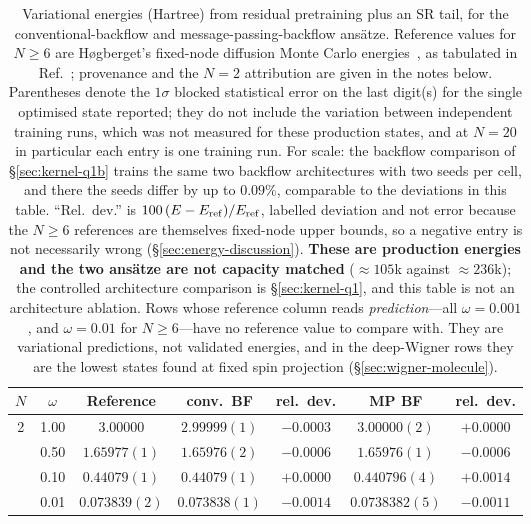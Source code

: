 \begin{table}[htbp]
  \centering
  \caption[Variational energies against the available references]{Variational energies
  (Hartree) from residual pretraining plus an SR tail, for the conventional-backflow and
  message-passing-backflow ans\"atze. Reference values for $N\ge6$ are H{\o}gberget's
  fixed-node diffusion Monte Carlo energies~\cite{Hogberget2013-DMC}, as tabulated in
  Ref.~\cite{Nordhagen2023-NeuralNetworksFermions}; provenance and the $N{=}2$ attribution
  are given in the notes below. Parentheses denote the $1\sigma$ blocked statistical error on the
  last digit(s) for the single optimised state reported; they do not include the variation
  between independent training runs, which was not measured for these production states,
  and at $N{=}20$ in particular each entry is one training run. For scale: the backflow
  comparison of \S\ref{sec:kernel-q1b} trains the same two backflow architectures with two
  seeds per cell, and there the seeds differ by up to $0.09\%$, comparable to the deviations
  in this table. ``Rel.\ dev.''
  is $100\,(E-E_{\rm ref})/E_{\rm ref}$, labelled deviation and not error because the
  $N\ge6$ references are themselves fixed-node upper bounds, so a negative entry is not
  necessarily wrong (\S\ref{sec:energy-discussion}). \textbf{These are production energies and
  the two ans\"atze are not capacity matched} ($\approx105$k against $\approx236$k); the
  controlled architecture comparison is \S\ref{sec:kernel-q1}, and this table is not an
  architecture ablation. Rows whose reference column reads \emph{prediction}---all
  $\omega=0.001$, and $\omega=0.01$ for $N\ge6$---have no reference value to compare with.
  They are variational predictions, not validated energies, and in the deep-Wigner rows they
  are the lowest states found at fixed spin projection (\S\ref{sec:wigner-molecule}).}
  \label{tab:energies}
  \begin{threeparttable}
    \begin{tabular}{c|c|c|cc|cc}
      \toprule
      $N$ & $\omega$ & Reference & conv.\ BF & rel.\ dev. & MP BF & rel.\ dev. \\
      \midrule
      2 & 1.00 & $3.00000$ & $2.99999(1)$ & $-0.0003$ & $3.00000(2)$ & $+0.0000$ \\
         & 0.50 & $1.65977(1)$ & $1.65976(2)$ & $-0.0006$ & $1.65976(1)$ & $-0.0006$ \\
         & 0.10 & $0.44079(1)$ & $0.44079(1)$ & $+0.0000$ & $0.440796(4)$ & $+0.0014$ \\
         & 0.01 & $0.073839(2)$ & $0.073838(1)$ & $-0.0014$ & $0.0738382(5)$ & $-0.0011$ \\

\end{tabular}
\end{threeparttable}
\end{table}
